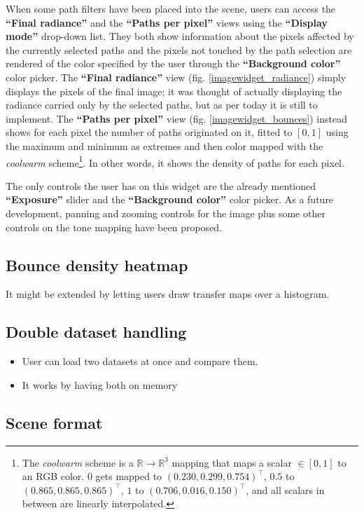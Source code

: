 When some path filters have been placed into the scene, users can access the \textbf{“Final radiance”} and the \textbf{“Paths per pixel”} views using the \textbf{“Display mode”} drop-down list. They both show information about the pixels affected by the currently selected paths and the pixels not touched by the path selection are rendered of the color specified by the user through the \textbf{“Background color”} color picker. The \textbf{“Final radiance”} view (fig. \ref{imagewidget_radiance}) simply displays the pixels of the final image; it was thought of actually displaying the radiance carried only by the selected paths, but as per today it is still to implement. The \textbf{“Paths per pixel”} view (fig. \ref{imagewidget_bounces}) instead shows for each pixel the number of paths originated on it, fitted to $[0,1]$ using the maximum and minimum as extremes and then color mapped with the \textit{coolwarm} scheme\footnote{The \textit{coolwarm} scheme is a $\mathbb{R} \to \mathbb{R}^3$ mapping that maps a scalar $\in[0,1]$ to an RGB color. $0$ gets mapped to $(0.230, 0.299, 0.754)^\intercal$, $0.5$ to $(0.865, 0.865, 0.865)^\intercal$, $1$ to $(0.706, 0.016, 0.150)^\intercal$, and all scalars in between are linearly interpolated.}. In other words, it shows the density of paths for each pixel.

The only controls the user has on this widget are the already mentioned \textbf{“Exposure”} slider and the \textbf{“Background color”} color picker. As a future development, panning and zooming controls for the image plus some other controls on the tone mapping have been proposed.

\subsection{Bounce density heatmap}
\label{heatmap}
It might be extended by letting users draw transfer maps over a histogram.



\subsection{Double dataset handling}
\begin{itemize}
	\item User can load two datasets at once and compare them.
	\item It works by having both on memory
\end{itemize}


\subsection{Scene format}
\label{scene_format}

